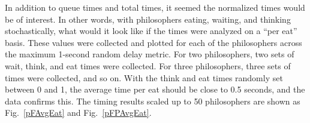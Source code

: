 \documentclass[conference,11pt]{IEEEtran}
\begin{document}
In addition to queue times and total times, it seemed the normalized times would be of interest. In other words, with philosophers eating, waiting, and thinking stochastically, what would it look like if the times were analyzed on a ``per eat'' basis. These values were collected and plotted for each of the philosophers across the maximum 1-second random delay metric. For two philosophers, two sets of wait, think, and eat times were collected. For three philosophers, three sets of times were collected, and so on. With the think and eat times randomly set between 0 and 1, the average time per eat should be close to 0.5 seconds, and the data confirms this. The timing results scaled up to 50 philosophers are shown as Fig.~\ref{pFAvgEat} and Fig.~\ref{pFPAvgEat}.
\end{document}
